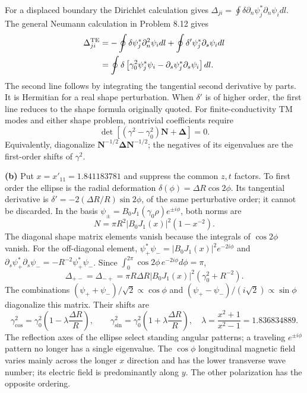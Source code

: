 For a displaced boundary the Dirichlet calculation gives
$\Delta_{ji}=\oint\delta\partial_n\psi_j^*\partial_n\psi_i dl$.
The general Neumann calculation in Problem 8.12 gives
\begin{align*}
\Delta_{ji}^{\rm TE}
&=-\oint\delta\psi_j^*\partial_n^2\psi_i dl
+\oint\delta'\psi_j^*\partial_s\psi_i dl\\
&=\oint\delta\left[\gamma_0^2\psi_j^*\psi_i
-\partial_s\psi_j^*\partial_s\psi_i\right]dl.
\end{align*}
The second line follows by integrating the tangential second
derivative by parts.  It is Hermitian for a real shape perturbation.
When $\delta'$ is of higher order, the first line reduces to the
shape formula originally quoted.  For finite-conductivity TM modes
and either shape problem, nontrivial coefficients require
\[
\det[(\gamma^2-\gamma_0^2)\mathbf N+\boldsymbol\Delta]=0.
\]
Equivalently, diagonalize
$\mathbf N^{-1/2}\boldsymbol\Delta\mathbf N^{-1/2}$; the negatives of
its eigenvalues are the first-order shifts of $\gamma^2$.

\textbf{(b)} Put $x=x'_{11}=1.841183781$ and suppress the common
$z,t$ factors.  To first order the ellipse is the radial deformation
$\delta(\phi)=\Delta R\cos2\phi$.  Its tangential derivative is
$\delta'=-2(\Delta R/R)\sin2\phi$, of the same perturbative order;
it cannot be discarded.  In the basis
$\psi_\pm=B_0J_1(\gamma_0\rho)e^{\pm i\phi}$, both norms are
\[
N=\pi R^2|B_0J_1(x)|^2(1-x^{-2}).
\]
The diagonal shape matrix elements vanish because the integrals of
$\cos2\phi$ vanish.  For the off-diagonal element,
$\psi_+^*\psi_-=|B_0J_1(x)|^2e^{-2i\phi}$ and
$\partial_s\psi_+^*\partial_s\psi_-=-R^{-2}\psi_+^*\psi_-$.
Since $\int_0^{2\pi}\cos2\phi\,e^{-2i\phi}d\phi=\pi$,
\[
\Delta_{+-}=\Delta_{-+}
=\pi R\Delta R|B_0J_1(x)|^2(\gamma_0^2+R^{-2}).
\]
The combinations $(\psi_++\psi_-)/\sqrt2\propto\cos\phi$
and $(\psi_+-\psi_-)/(i\sqrt2)\propto\sin\phi$ diagonalize this
matrix.  Their shifts are
\[
\boxed{\gamma_{\cos}^2=\gamma_0^2
\left(1-\lambda\frac{\Delta R}{R}\right),\qquad
\gamma_{\sin}^2=\gamma_0^2
\left(1+\lambda\frac{\Delta R}{R}\right),\quad
\lambda=\frac{x^2+1}{x^2-1}=1.836834889.}
\]
The reflection axes of the ellipse select standing angular patterns;
a traveling $e^{\pm i\phi}$ pattern no longer has a single
eigenvalue.  The $\cos\phi$ longitudinal magnetic field varies
mainly across the longer $x$ direction and has the lower transverse
wave number; its electric field is predominantly along $y$.
The other polarization has the opposite ordering.

